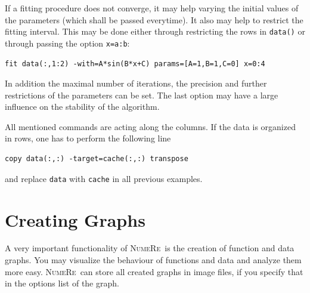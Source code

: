 \documentclass[DIV=14,headsepline,footsepline]{scrbook}
\newcommand{\NR}{\textsc{Nu\-me\-Re}}
\begin{document}
				If a fitting procedure does not converge, it may help varying the initial values of the parameters (which shall be passed everytime). It also may help to restrict the fitting interval. This may be done either through restricting the rows in \verb+data()+ or through passing the option \verb+x=a:b+:
				\begin{lstlisting}
fit data(:,1:2) -with=A*sin(B*x+C) params=[A=1,B=1,C=0] x=0:4
				\end{lstlisting}
				In addition the maximal number of iterations, the precision and further restrictions of the parameters can be set. The last option may have a large influence on the stability of the algorithm.
				
				All mentioned commands are acting along the columns. If the data is organized in rows, one has to perform the following line
				\begin{lstlisting}
copy data(:,:) -target=cache(:,:) transpose
				\end{lstlisting}
				and replace \verb+data+ with \verb+cache+ in all previous examples.
		\chapter{Creating Graphs}
			A very important functionality of \NR\ is the creation of function and data graphs. You may visualize the behaviour of functions and data and analyze them more easy. \NR\ can store all created graphs in image files, if you specify that in the options list of the graph.
\end{document}
